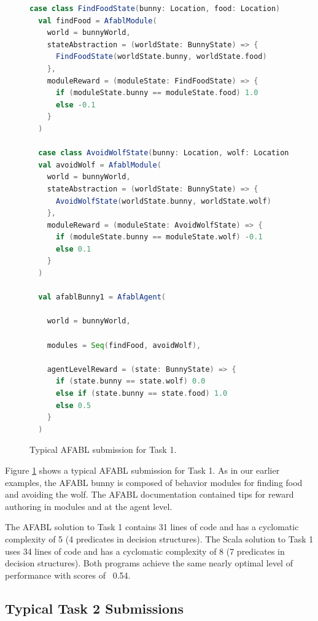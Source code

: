 \begin{figure}[!h]
\begin{center}

\begin{lstlisting}[language=Scala]
  case class FindFoodState(bunny: Location, food: Location)
  val findFood = AfablModule(
    world = bunnyWorld,
    stateAbstraction = (worldState: BunnyState) => {
      FindFoodState(worldState.bunny, worldState.food)
    },
    moduleReward = (moduleState: FindFoodState) => {
      if (moduleState.bunny == moduleState.food) 1.0
      else -0.1
    }
  )

  case class AvoidWolfState(bunny: Location, wolf: Location)
  val avoidWolf = AfablModule(
    world = bunnyWorld,
    stateAbstraction = (worldState: BunnyState) => {
      AvoidWolfState(worldState.bunny, worldState.wolf)
    },
    moduleReward = (moduleState: AvoidWolfState) => {
      if (moduleState.bunny == moduleState.wolf) -0.1
      else 0.1
    }
  )

  val afablBunny1 = AfablAgent(

    world = bunnyWorld,

    modules = Seq(findFood, avoidWolf),

    agentLevelReward = (state: BunnyState) => {
      if (state.bunny == state.wolf) 0.0
      else if (state.bunny == state.food) 1.0
      else 0.5
    }
  )
\end{lstlisting}

\caption{Typical AFABL submission for Task 1.}
\end{center}
\label{fig:afabl-task1-submission}
\end{figure}

Figure \ref{fig:afabl-task1-submission} shows a typical AFABL submission for Task 1. As in our earlier examples, the AFABL bunny is composed of behavior modules for finding food and avoiding the wolf. The AFABL documentation contained tips for reward authoring in modules and at the agent level.


The AFABL solution to Task 1 contains 31 lines of code and has a cyclomatic complexity of 5 (4 predicates in decision structures). The Scala solution to Task 1 uses 34 lines of code and has a cyclomatic complexity of 8 (7 predicates in decision structures). Both programs achieve the same nearly optimal level of performance with scores of ~0.54.

\subsection{Typical Task 2 Submissions}

